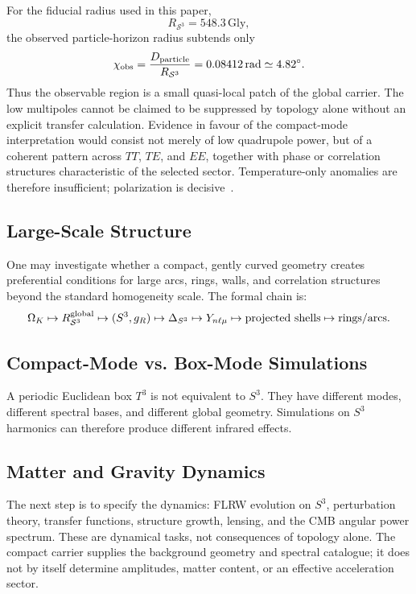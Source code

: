 \documentclass[aps,prd,onecolumn,superscriptaddress,longbibliography,nofootinbib,notitlepage]{revtex4-2}
\newcommand{\Gly}{\,\mathrm{Gly}}
\begin{document}
For the fiducial radius used in this paper,
\begin{equation}
  R_{\mathcal S^3}=548.3\Gly,
\end{equation}
the observed particle-horizon radius subtends only
\begin{equation}
  \chi_{\rm obs}
  =\frac{D_{\rm particle}}{R_{\mathcal S^3}}
  =0.08412\,\mathrm{rad}\simeq4.82^\circ .
\end{equation}
Thus the observable region is a small quasi-local patch of the global carrier.
The low multipoles cannot be claimed to be suppressed by topology alone without
an explicit transfer calculation. Evidence in favour of the compact-mode
interpretation would consist not merely of low quadrupole power, but of a
coherent pattern across $TT$, $TE$, and $EE$, together with phase or correlation
structures characteristic of the selected sector. Temperature-only anomalies are
therefore insufficient; polarization is decisive~\cite{LiteBIRD2021}.

\subsection{Large-Scale Structure}

One may investigate whether a compact, gently curved geometry creates preferential
conditions for large arcs, rings, walls, and correlation structures beyond the
standard homogeneity scale. The formal chain is:
\begin{equation}
  \Omega_K \mapsto R_{\mathcal{S}^3}^{\rm global}
  \mapsto (S^3, g_R)
  \mapsto \Delta_{S^3}
  \mapsto Y_{n\ell\mu}
  \mapsto \text{projected shells}
  \mapsto \text{rings/arcs.}
\end{equation}

\subsection{Compact-Mode vs. Box-Mode Simulations}

A periodic Euclidean box $T^3$ is not equivalent to $S^3$. They have different
modes, different spectral bases, and different global geometry. Simulations on
$S^3$ harmonics can therefore produce different infrared effects.

\subsection{Matter and Gravity Dynamics}

The next step is to specify the dynamics: FLRW evolution on $S^3$, perturbation
theory, transfer functions, structure growth, lensing, and the CMB angular power
spectrum. These are dynamical tasks, not consequences of topology alone. The
compact carrier supplies the background geometry and spectral catalogue; it does
not by itself determine amplitudes, matter content, or an effective acceleration
sector.
\end{document}
